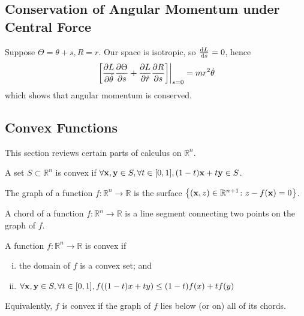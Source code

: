 \subsection{Conservation of Angular Momentum under Central Force}
\begin{example}
	Suppose \( \Theta = \theta + s, R = r \).
	Our space is isotropic, so \( \dv{L}{s} = 0 \), hence
	\[
		\eval{\qty[\pdv{L}{\dot\theta}\pdv{\Theta}{s} + \pdv{L}{\dot r}\pdv{R}{s}]}_{s=0} = mr^2\dot\theta
	\]
	which shows that angular momentum is conserved.
\end{example}

\subsection{Convex Functions}
This section reviews certain parts of calculus on \( \mathbb R^n \).
\begin{definition}
	A set \( S \subset \mathbb R^n \) is convex if \( \forall \vb x, \vb y \in S, \forall t \in [0,1], (1-t)\vb x + t \vb y \in S \).
\end{definition}
\begin{definition}
	The graph of a function \( f \colon \mathbb R^n \to \mathbb R \) is the surface \( \qty{ (\vb x, z)\in \mathbb R^{n+1} \colon z - f(\vb x) = 0} \).
\end{definition}
\begin{definition}
	A chord of a function \( f \colon \mathbb R^n \to \mathbb R \) is a line segment connecting two points on the graph of \( f \).
\end{definition}
\begin{definition}
	A function \( f \colon \mathbb R^n \to \mathbb R \) is convex if
	\begin{enumerate}[(i)]
		\item the domain of \( f \) is a convex set; and
		\item \( \forall \vb x, \vb y \in S, \forall t \in [0,1], f((1-t)x + ty) \leq (1-t)f(x) + tf(y) \)
	\end{enumerate}
	Equivalently, \( f \) is convex if the graph of \( f \) lies below (or on) all of its chords.
\end{definition}
